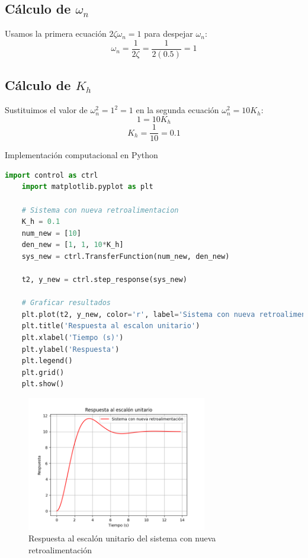 \documentclass[10pt]{article}
\theoremstyle{definition}
\theoremstyle{remark}
\theoremstyle{definition}
\numberwithin{equation}{prob}
\begin{document}
\subsection*{Cálculo de \( \omega_n \)}
Usamos la primera ecuación \( 2\zeta \omega_n = 1 \) para despejar \( \omega_n \):
\[
	\omega_n = \frac{1}{2\zeta} = \frac{1}{2(0.5)} = 1
\]

\subsection*{Cálculo de \( K_h \)}
Sustituimos el valor de \( \omega_n^2 = 1^2 = 1 \) en la segunda ecuación \( \omega_n^2 = 10K_h \):
\[
	1 = 10K_h
\]
\[
	K_h = \frac{1}{10} = 0.1
\]


Implementación computacional en Python
\begin{lstlisting}[language=Python]
	import control as ctrl
	import matplotlib.pyplot as plt

	# Sistema con nueva retroalimentacion
	K_h = 0.1
	num_new = [10]
	den_new = [1, 1, 10*K_h]
	sys_new = ctrl.TransferFunction(num_new, den_new)

	t2, y_new = ctrl.step_response(sys_new)

	# Graficar resultados
	plt.plot(t2, y_new, color='r', label='Sistema con nueva retroalimentacion')
	plt.title('Respuesta al escalon unitario')
	plt.xlabel('Tiempo (s)')
	plt.ylabel('Respuesta')
	plt.legend()
	plt.grid()
	plt.show()
\end{lstlisting}

\begin{figure}[h]
	\centering
	\includegraphics[width=0.7\textwidth]{./figures/Figura 5 ejercicio 5.png}
	\caption{Respuesta al escalón unitario del sistema con nueva retroalimentación}
\end{figure}

\newpage
\end{document}
